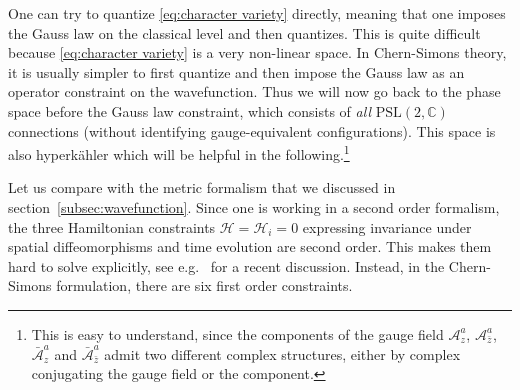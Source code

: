 \documentclass[12pt,a4paper]{article}
\newcommand\PSL{\text{PSL}}
\newcommand\CC{\mathbb{C}}
\begin{document}
One can try to quantize \eqref{eq:character variety} directly, meaning that one imposes the Gauss law on the classical level and then quantizes. This is quite difficult because \eqref{eq:character variety} is a very non-linear space. In Chern-Simons theory, it is usually simpler to first quantize and then impose the Gauss law as an operator constraint on the wavefunction. Thus we will now go back to the phase space before the Gauss law constraint, which consists of \emph{all} $\PSL(2,\CC)$ connections (without identifying gauge-equivalent configurations). This space is also hyperk\"ahler which will be helpful in the following.\footnote{This is easy to understand, since the components of the gauge field $\mathcal{A}_z^a$, $\mathcal{A}_{\bar{z}}^a$, $\bar{\mathcal{A}}_z^a$ and $\bar{\mathcal{A}}_{\bar{z}}^a$ admit two different complex structures, either by complex conjugating the gauge field or the component.} 

Let us compare with the metric formalism that we discussed in section~\ref{subsec:wavefunction}. Since one is working in a second order formalism, the three Hamiltonian constraints $\mathcal{H}=\mathcal{H}_i=0$ expressing invariance under spatial diffeomorphisms and time evolution are second order. This makes them hard to solve explicitly, see e.g.\ \cite{Chakraborty:2023yed} for a recent discussion. Instead, in the Chern-Simons formulation, there are six first order constraints. 
\end{document}
